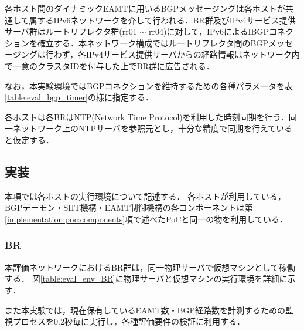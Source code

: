 各ホスト間のダイナミックEAMTに用いるBGPメッセージングは各ホストが共通して属するIPv6ネットワークを介して行われる．BR群及びIPv4サービス提供サーバ群はルートリフレクタ群(rr01 $\cdots$ rr04)に対して，IPv6によるIBGPコネクションを確立する．本ネットワーク構成ではルートリフレクタ間のBGPメッセージングは行わず，各IPv4サービス提供サーバからの経路情報はネットワーク内で一意のクラスタIDを付与した上でBR群に広告される．

なお，本実験環境ではBGPコネクションを維持するための各種パラメータを表\ref{table:eval_bgp_timer}の様に指定する．

各ホストは各BRはNTP(Network Time Protocol)\cite{RFC5905}を利用した時刻同期を行う．同一ネットワーク上のNTPサーバを参照元とし，十分な精度で同期を行えていると仮定する．


\begin{table}[]
    \label{table:eval_bgp_timer}
    \caption{BGPコネクションで利用したパラメータ}
    \centering
\end{table}

\subsection{実装}
本項では各ホストの実行環境について記述する．
各ホストが利用している，BGPデーモン・SIIT機構・EAMT制御機構の各コンポーネントは第\ref{implementation:poc:components}項で述べたPoCと同一の物を利用している．


\subsubsection{BR}
本評価ネットワークにおけるBR群は，同一物理サーバで仮想マシンとして稼働する．
図\ref{table:eval_env_BR}に物理サーバと仮想マシンの実行環境を詳細に示す．

また本実験では，現在保有しているEAMT数・BGP経路数を計測するための監視プロセスを0.2秒毎に実行し，各種評価要件の検証に利用する．

